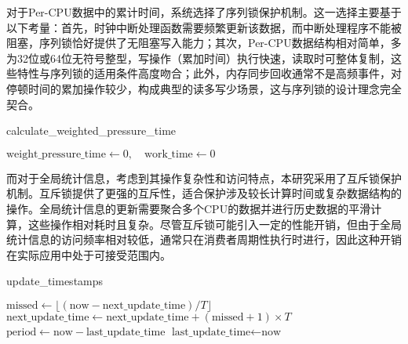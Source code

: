 对于Per-CPU数据中的累计时间，系统选择了序列锁保护机制。这一选择主要基于以下考量：首先，时钟中断处理函数需要频繁更新该数据，而中断处理程序不能被阻塞，序列锁恰好提供了无阻塞写入能力；其次，Per-CPU数据结构相对简单，多为32位或64位无符号整型，写操作（累加时间）执行快速，读取时可整体复制，这些特性与序列锁的适用条件高度吻合；此外，内存同步回收通常不是高频事件，对停顿时间的累加操作较少，构成典型的读多写少场景，这与序列锁的设计理念完全契合。

\begin{algorithm}[H]
    \caption{calculate\_weighted\_pressure\_time}
    \label{alg:calculate_weighted_pressure_time}
    \SetAlgoLined
    \DontPrintSemicolon
    \(\text{weight\_pressure\_time} \gets 0,\quad \text{work\_time} \gets 0\)\;
    \end{algorithm}
而对于全局统计信息，考虑到其操作复杂性和访问特点，本研究采用了互斥锁保护机制。互斥锁提供了更强的互斥性，适合保护涉及较长计算时间或复杂数据结构的操作。全局统计信息的更新需要聚合多个CPU的数据并进行历史数据的平滑计算，这些操作相对耗时且复杂。尽管互斥锁可能引入一定的性能开销，但由于全局统计信息的访问频率相对较低，通常只在消费者周期性执行时进行，因此这种开销在实际应用中处于可接受范围内。
\begin{algorithm}[H]
        \caption{update\_timestamps}
        \label{alg:update_timestamps}
        \SetAlgoLined
        \DontPrintSemicolon
        \(\text{missed} \gets \lfloor(\text{now}-\text{next\_update\_time})/T\rfloor\)\;
        \(\text{next\_update\_time} \gets \text{next\_update\_time} + (\text{missed}+1) \times T\)\;
        \(\text{period}\gets \text{now}-\text{last\_update\_time}\)\;
         \(\text{last\_update\_time}\gets \text{now}\)\;
\end{algorithm}


